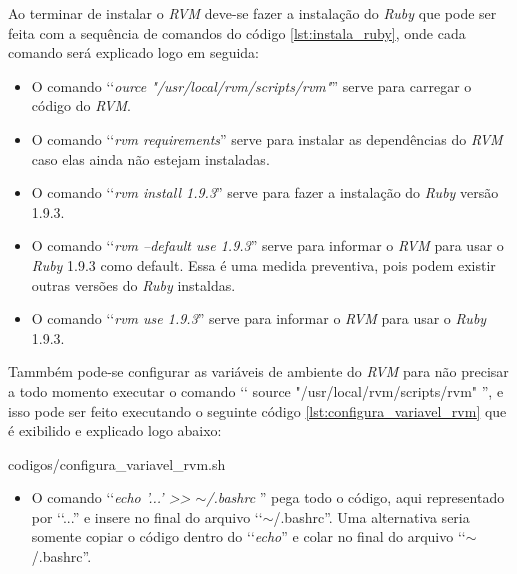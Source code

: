 Ao terminar de instalar o \emph{RVM} deve-se fazer a instalação do \emph{Ruby} que pode ser feita com a 
sequência de comandos do código \ref{lst:instala_ruby}, onde cada comando será 
explicado logo em seguida:
 

 
\begin{itemize}

 \item O comando ‘‘\emph{ource "/usr/local/rvm/scripts/rvm"}'' serve para carregar o código do \emph{RVM}.
 
 \item O comando ‘‘\emph{rvm requirements}'' serve para instalar as dependências do \emph{RVM} caso elas 
 ainda não estejam instaladas.
 
 \item O comando ‘‘\emph{rvm install 1.9.3}'' serve para fazer a instalação do \emph{Ruby} versão 1.9.3.
 
 \item O comando ‘‘\emph{rvm --default use 1.9.3}'' serve para informar o \emph{RVM} para usar o \emph{Ruby}
 1.9.3 como default. Essa é uma medida preventiva, pois podem existir outras versões do \emph{Ruby} instaldas.
 
 \item O comando ‘‘\emph{rvm use 1.9.3}'' serve para informar o \emph{RVM} para usar o \emph{Ruby} 1.9.3.
 
\end{itemize}

  
Tammbém pode-se configurar as variáveis de ambiente do \emph{RVM} para não precisar a todo momento executar
o comando ‘‘ source "/usr/local/rvm/scripts/rvm" '', e isso pode ser feito executando o seguinte código
\ref{lst:configura_variavel_rvm} que é exibilido e explicado logo abaixo:
 

{codigos/configura_variavel_rvm.sh}
 
\begin{itemize}

  \item O comando ‘‘\emph{echo '...' >> $\sim$/.bashrc }'' pega todo o código, aqui representado por ‘‘...'' 
  e insere no final do arquivo ‘‘$\sim$/.bashrc''. Uma alternativa seria somente copiar o código dentro do 
  ‘‘\emph{echo}'' e colar no final do arquivo ‘‘$\sim$/.bashrc''.
  
\end{itemize}

